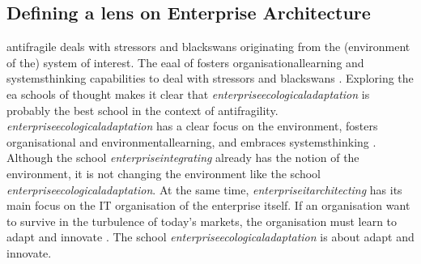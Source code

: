 \subsection{Defining a lens on Enterprise Architecture}
\label{sub:definingea}
\Gls{antifragile} deals with \glspl{stressor} and \glspl{blackswan} originating from the (environment of the) system of interest. The \acrlong{eaal} of \textcite{Botjes2021} fosters \gls{organisationallearning} and \gls{systemsthinking} capabilities to deal with \glspl{stressor} and \glspl{blackswan} \parencite[pp.~2--4]{Botjes2021}. Exploring the \gls{ea} schools of thought \parencite{Lapalme2012} makes it clear that \textit{\gls{enterpriseecologicaladaptation}} is probably the best school in the context of \gls{antifragility}. \textit{\gls{enterpriseecologicaladaptation}} has a clear focus on the environment, fosters organisational and \gls{environmentallearning}, and embraces \gls{systemsthinking} \parencite[pp.~40--41]{Lapalme2012}. Although the school \textit{\gls{enterpriseintegrating}} already has the notion of the environment, it is not changing the environment like the school \textit{\gls{enterpriseecologicaladaptation}}. At the same time, \textit{\gls{enterpriseitarchitecting}} has its main focus on the IT organisation of the enterprise itself. If an organisation want to survive in the turbulence of today's markets, the organisation must learn to adapt and innovate \parencite[p.~42]{Lapalme2012}. The school \textit{\gls{enterpriseecologicaladaptation}} is about adapt and innovate.

